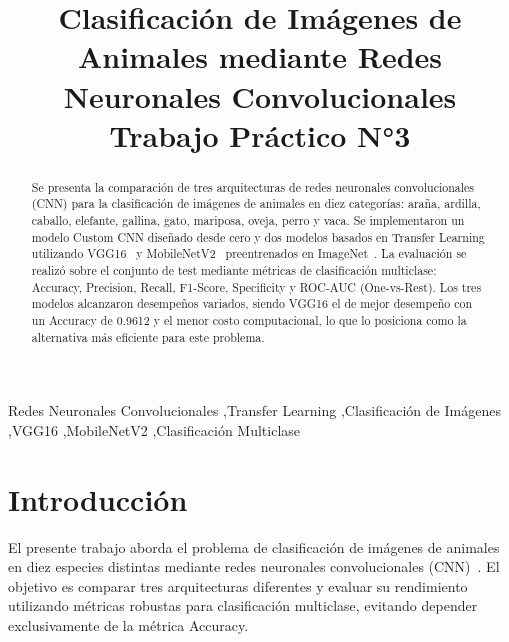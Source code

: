 \documentclass[1p,12pt]{elsarticle}
\begin{document}
\begin{frontmatter}

\title{Clasificación de Imágenes de Animales mediante Redes Neuronales
       Convolucionales \\ Trabajo Práctico N°3}



\begin{abstract}
Se presenta la comparación de tres arquitecturas de redes neuronales
convolucionales (CNN) para la clasificación de imágenes de animales en diez
categorías: araña, ardilla, caballo, elefante, gallina, gato, mariposa, oveja,
perro y vaca. Se implementaron un modelo Custom CNN diseñado desde cero y dos
modelos basados en Transfer Learning utilizando VGG16~\cite{Simonyan2015} y
MobileNetV2~\cite{Sandler2018} preentrenados en ImageNet~\cite{Deng2009}. La
evaluación se realizó sobre el conjunto de test mediante métricas de
clasificación multiclase: Accuracy, Precision, Recall, F1-Score, Specificity y
ROC-AUC (One-vs-Rest). Los tres modelos alcanzaron desempeños variados, siendo
VGG16 el de mejor desempeño con un Accuracy de 0.9612 y el menor costo
computacional, lo que lo posiciona como la alternativa más eficiente para este
problema.
\end{abstract}

\begin{keyword}
Redes Neuronales Convolucionales \sep Transfer Learning \sep Clasificación de
Imágenes \sep VGG16 \sep MobileNetV2 \sep Clasificación Multiclase
\end{keyword}

\end{frontmatter}

\section{Introducción}
\label{sec:intro}

El presente trabajo aborda el problema de clasificación de imágenes de animales
en diez especies distintas mediante redes neuronales convolucionales
(CNN)~\cite{LeCun2015}. El objetivo es comparar tres arquitecturas diferentes y
evaluar su rendimiento utilizando métricas robustas para clasificación
multiclase, evitando depender exclusivamente de la métrica Accuracy.
\end{document}
